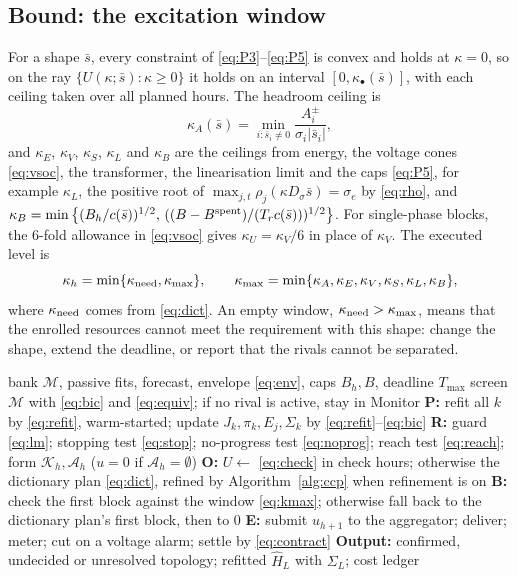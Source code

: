 \documentclass[journal,onecolumn,11pt]{IEEEtran}
\begin{document}
\subsection{Bound: the excitation window}\label{sec:window}
For a shape $\bar s$, every constraint of \eqref{eq:P3}--\eqref{eq:P5} is convex and holds at $\kappa=0$, so on the ray $\{U(\kappa;\bar s):\kappa\ge0\}$ it holds on an interval $[0,\kappa_\bullet(\bar s)]$, with each ceiling taken over all planned hours. The headroom ceiling is
\begin{equation}\label{eq:kA}
\kappa_A(\bar s)=\min_{i:\bar s_i\ne0}\frac{A_i^\pm}{\sigma_i|\bar s_i|},
\end{equation}
and $\kappa_E$, $\kappa_V$, $\kappa_S$, $\kappa_L$ and $\kappa_B$ are the ceilings from energy, the voltage cones \eqref{eq:vsoc}, the transformer, the linearisation limit and the caps \eqref{eq:P5}, for example $\kappa_L$, the positive root of $\max_{j,t}\rho_j(\kappa D_\sigma\bar s)=\sigma_e$ by \eqref{eq:rho}, and $\kappa_B=\min\big\{(B_h/c(\bar s))^{1/2},\,((B-B^{\rm spent})/(T_rc(\bar s)))^{1/2}\big\}$. For single-phase blocks, the 6-fold allowance in \eqref{eq:vsoc} gives $\kappa_U=\kappa_V/6$ in place of $\kappa_V$. The executed level is
\begin{equation}\label{eq:kmax}
\kappa_h=\min\{\kappa_{\rm need},\kappa_{\max}\},\qquad \kappa_{\max}=\min\{\kappa_A,\kappa_E,\kappa_V,\kappa_S,\kappa_L,\kappa_B\},
\end{equation}
where $\kappa_{\rm need}$ comes from \eqref{eq:dict}. An empty window, $\kappa_{\rm need}>\kappa_{\max}$, means that the enrolled resources cannot meet the requirement with this shape: change the shape, extend the deadline, or report that the rivals cannot be separated.

\begin{algorithm}[t]
\caption{PROBE, one feeder-day}\label{alg:probe}
\begin{algorithmic}[1]
\Require bank $\mathcal M$, passive fits, forecast, envelope \eqref{eq:env}, caps $B_h,B$, deadline $T_{\max}$
\State screen $\mathcal M$ with \eqref{eq:bic} and \eqref{eq:equiv}; if no rival is active, stay in Monitor
  \State \textbf{P:} refit all $k$ by \eqref{eq:refit}, warm-started; update $J_k,\pi_k,E_j,\Sigma_k$ by \eqref{eq:refit}--\eqref{eq:bic}
  \State \textbf{R:} guard \eqref{eq:lm}; stopping test \eqref{eq:stop}; no-progress test \eqref{eq:noprog}; reach test \eqref{eq:reach}; form $\mathcal K_h,\mathcal A_h$ ($u=0$ if $\mathcal A_h=\emptyset$)
  \State \textbf{O:} $U\gets$ \eqref{eq:check} in check hours; otherwise the dictionary plan \eqref{eq:dict}, refined by Algorithm~\ref{alg:ccp} when refinement is on
  \State \textbf{B:} check the first block against the window \eqref{eq:kmax}; otherwise fall back to the dictionary plan's first block, then to $0$
  \State \textbf{E:} submit $u_{h+1}$ to the aggregator; deliver; meter; cut on a voltage alarm; settle by \eqref{eq:contract}
\EndFor
\State \textbf{Output:} confirmed, undecided or unresolved topology; refitted $\hat H_L$ with $\Sigma_L$; cost ledger
\end{algorithmic}
\end{algorithm}
\end{document}
